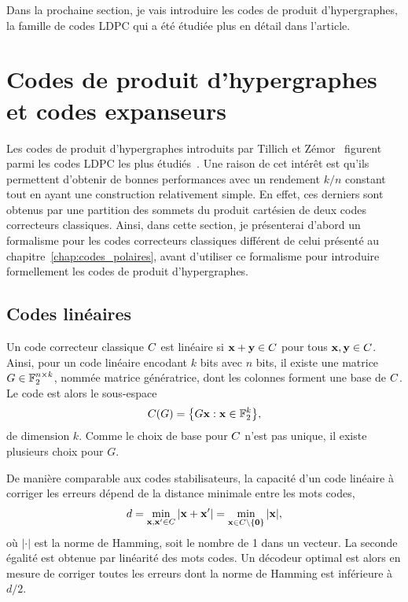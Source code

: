 Dans la prochaine section,
je vais introduire les codes de produit d'hypergraphes, 
la famille de codes LDPC qui a été étudiée plus en détail dans l'article.

\section{Codes de produit d'hypergraphes et codes expanseurs}

Les codes de produit d'hypergraphes introduits par Tillich et Zémor~\cite{tillich_quantum_2014}
figurent parmi les codes LDPC les plus étudiés~\cite{grospellier_combining_2020, grospellier_numerical_2018, leverrier_quantum_2015, kovalev_improved_2012, kovalev_numerical_2018}.
Une raison de cet intérêt est qu'ils permettent d'obtenir de bonnes performances 
avec un rendement $k/n$ constant tout en ayant une construction relativement simple.
En effet,
ces derniers sont obtenus par une partition des sommets du produit cartésien de
deux codes correcteurs classiques.
Ainsi,
dans cette section,
je présenterai d'abord un formalisme pour les codes correcteurs classiques
différent de celui présenté au chapitre~\ref{chap:codes_polaires},
avant d'utiliser ce formalisme pour introduire formellement les codes
de produit d'hypergraphes.

\subsection{Codes linéaires}

Un code correcteur classique $C$ est linéaire si $\vb x + \vb y \in C$ 
pour tous $\vb x, \vb y \in C$.
Ainsi,
pour un code linéaire encodant $k$ bits avec $n$ bits,
il existe une matrice $G \in \mathbb{F}_{2}^{n \times k}$,
nommée matrice génératrice,
dont les colonnes forment une base de $C$.
Le code est alors le sous-espace
\begin{align}
	C(G) = \qty{
		G \vb x : \vb x \in \mathbb{F}_{2}^k
	},
\end{align}
de dimension $k$.
Comme le choix de base pour $C$ n'est pas unique,
il existe plusieurs choix pour $G$.

De manière comparable aux codes stabilisateurs,
la capacité d'un code linéaire à corriger les erreurs dépend de la distance minimale entre 
les mots codes,
\begin{align}
	d = \min_{\vb x, \vb x' \in C} | \vb x + \vb x'| = \min_{\vb x \in C \setminus \qty{\vb 0}} |\vb x|,
\end{align}
où $|\cdot|$ est la norme de Hamming, soit le nombre de 1 dans un vecteur.
La seconde égalité est obtenue par linéarité des mots codes.
Un décodeur optimal est alors en mesure de corriger toutes les erreurs dont la norme de Hamming
est inférieure à $d/2$.

